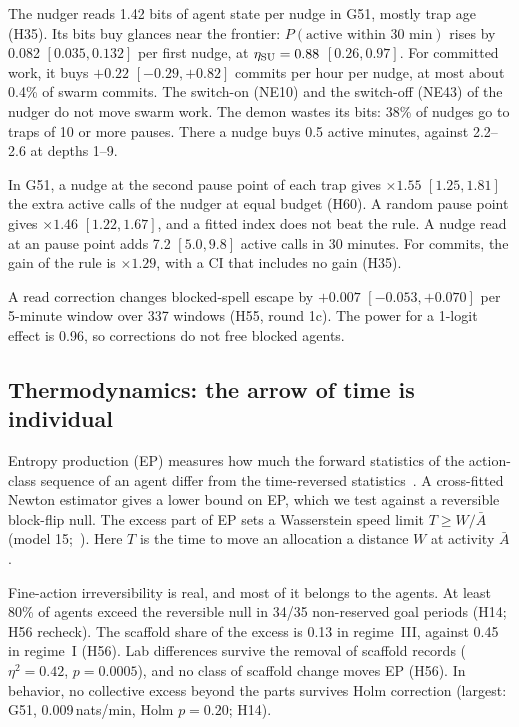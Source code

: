 The nudger reads 1.42 bits of agent state per nudge in G51, mostly trap age (H35).
Its bits buy glances near the frontier: $P(\text{active within 30 min})$ rises by 0.082 $[0.035, 0.132]$ per first nudge, at $\eta_{\rm SU}=0.88$ $[0.26, 0.97]$.
For committed work, it buys $+0.22$ $[-0.29, +0.82]$ commits per hour per nudge, at most about 0.4\% of swarm commits.
The switch-on (NE10) and the switch-off (NE43) of the nudger do not move swarm work.
The demon wastes its bits: 38\% of nudges go to traps of 10 or more pauses.
There a nudge buys 0.5 active minutes, against 2.2--2.6 at depths 1--9.

In G51, a nudge at the second pause point of each trap gives $\times1.55$ $[1.25, 1.81]$ the extra active calls of the nudger at equal budget (H60).
A random pause point gives $\times1.46$ $[1.22, 1.67]$, and a fitted index does not beat the rule.
A nudge read at an pause point adds 7.2 $[5.0, 9.8]$ active calls in 30 minutes.
For commits, the gain of the rule is $\times1.29$, with a CI that includes no gain (H35).

A read correction changes blocked-spell escape by $+0.007$ $[-0.053, +0.070]$ per 5-minute window over 337 windows (H55, round 1c).
The power for a 1-logit effect is 0.96, so corrections do not free blocked agents.

\subsection{Thermodynamics: the arrow of time is individual}
\label{sec:info-thermo}

Entropy production (EP) measures how much the forward statistics of the action-class sequence of an agent differ from the time-reversed statistics~\cite{aguilera2026}.
A cross-fitted Newton estimator gives a lower bound on EP, which we test against a reversible block-flip null.
The excess part of EP sets a Wasserstein speed limit $T\ge W/\bar A$ (model 15;~\cite{kolchinsky2026}).
Here $T$ is the time to move an allocation a distance $W$ at activity $\bar A$.

Fine-action irreversibility is real, and most of it belongs to the agents.
At least 80\% of agents exceed the reversible null in 34/35 non-reserved goal periods (H14; H56 recheck).
The scaffold share of the excess is 0.13 in regime~III, against 0.45 in regime~I (H56).
Lab differences survive the removal of scaffold records ($\eta^2=0.42$, $p=0.0005$), and no class of scaffold change moves EP (H56).
In behavior, no collective excess beyond the parts survives Holm correction (largest: G51, 0.009\,nats/min, Holm $p=0.20$; H14).

